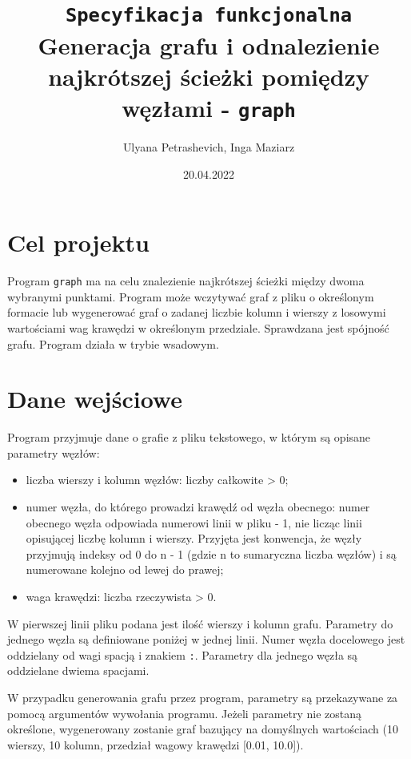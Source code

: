 \documentclass[]{article}
\title{\texttt{Specyfikacja funkcjonalna}\\Generacja grafu i odnalezienie najkrótszej ścieżki pomiędzy węzłami - \texttt{graph}}
\author{Ulyana Petrashevich, Inga Maziarz}
\date{20.04.2022}
\begin{document}
\maketitle

\section{Cel projektu}\label{header-n231}

Program \texttt{graph} ma na celu znalezienie najkrótszej ścieżki między dwoma wybranymi punktami. Program może wczytywać graf z pliku o określonym formacie lub wygenerować graf o zadanej liczbie kolumn i wierszy z losowymi wartościami wag krawędzi w określonym przedziale. Sprawdzana jest spójność grafu. Program działa w trybie wsadowym.

\section{Dane wejściowe}\label{header-n233}

Program przyjmuje dane o grafie z pliku tekstowego, w którym są opisane parametry węzłów:

\begin{itemize}
\item
  liczba wierszy i kolumn węzłów: liczby całkowite \textgreater{} 0;
\item
  numer węzła, do którego prowadzi krawędź od węzła obecnego: numer obecnego węzła odpowiada numerowi linii w pliku - 1, nie licząc linii opisującej liczbę kolumn i wierszy. Przyjęta jest konwencja, że węzły przyjmują indeksy od 0 do n - 1 (gdzie n to sumaryczna liczba węzłów) i są numerowane kolejno od lewej do prawej; 
\item
  waga krawędzi: liczba rzeczywista \textgreater{} 0.
\end{itemize}

W pierwszej linii pliku podana jest ilość wierszy i kolumn grafu. Parametry do jednego węzła są definiowane poniżej w jednej linii. Numer węzła docelowego jest oddzielany od wagi spacją i znakiem \texttt{:}. Parametry dla jednego węzła są oddzielane dwiema spacjami.

W przypadku generowania grafu przez program, parametry są przekazywane za pomocą argumentów wywołania programu. Jeżeli parametry nie zostaną określone, wygenerowany zostanie graf bazujący na domyślnych wartościach (10 wierszy, 10 kolumn, przedział wagowy krawędzi [0.01, 10.0]).
\end{document}
